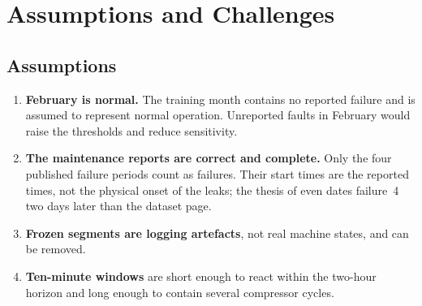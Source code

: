 \section{Assumptions and Challenges}
\label{sec:assumptions}

\subsection{Assumptions}
\begin{enumerate}[itemsep=2pt]
  \item \textbf{February is normal.} The training month contains no reported failure and is assumed to represent normal operation. Unreported faults in February would raise the thresholds and reduce sensitivity.
  \item \textbf{The maintenance reports are correct and complete.} Only the four published failure periods count as failures. Their start times are the reported times, not the physical onset of the leaks; the thesis of \citet{barros2020thesis} even dates failure~4 two days later than the dataset page.
  \item \textbf{Frozen segments are logging artefacts}, not real machine states, and can be removed.
  \item \textbf{Ten-minute windows} are short enough to react within the two-hour horizon and long enough to contain several compressor cycles.
\end{enumerate}

